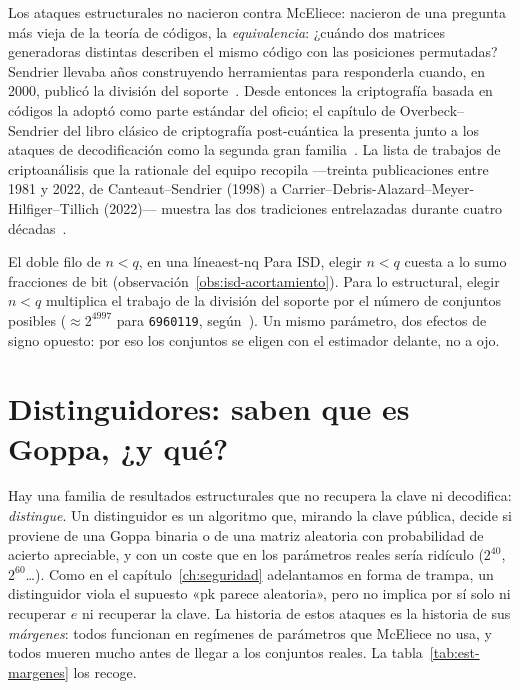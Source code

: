 \begin{historia}
Los ataques estructurales no nacieron contra McEliece: nacieron de
una pregunta más vieja de la teoría de códigos, la
\emph{equivalencia}: ¿cuándo dos matrices generadoras distintas
describen el mismo código con las posiciones permutadas? Sendrier
llevaba años construyendo herramientas para responderla cuando, en
2000, publicó la división del soporte~\cite{sendrier2000}. Desde
entonces la criptografía basada en códigos la adoptó como parte
estándar del oficio; el capítulo de Overbeck--Sendrier del libro
clásico de criptografía post-cuántica la presenta junto a los ataques
de decodificación como la segunda gran familia~\cite{overbeck2009}.
La lista de trabajos de criptoanálisis que la rationale del equipo
recopila ---treinta publicaciones entre 1981 y 2022, de
Canteaut--Sendrier (1998) a Carrier--Debris-Alazard--Meyer-Hilfiger--Tillich
(2022)--- muestra las dos tradiciones entrelazadas durante cuatro
décadas~\cite{cmrationale,canteautsendrier1998,carrier2022}.
\end{historia}

\begin{observacion}{El doble filo de $n<q$, en una línea}{est-nq}
Para ISD, elegir $n<q$ cuesta a lo sumo fracciones de bit
(observación~\ref{obs:isd-acortamiento}). Para lo estructural,
elegir $n<q$ multiplica el trabajo de la división del soporte por el
número de conjuntos posibles ($\approx 2^{4997}$ para
\texttt{6960119}, según~\cite{cmrationale}). Un mismo parámetro,
dos efectos de signo opuesto: por eso los conjuntos se eligen con el
estimador delante, no a ojo.
\end{observacion}

\section{Distinguidores: saben que es Goppa, ¿y qué?}\label{sec:est-distinguidores}

Hay una familia de resultados estructurales que no recupera la
clave ni decodifica: \emph{distingue}. Un distinguidor es un
algoritmo que, mirando la clave pública, decide si proviene de una
Goppa binaria o de una matriz aleatoria con probabilidad de acierto
apreciable, y con un coste que en los parámetros reales sería
ridículo ($2^{40}$, $2^{60}$\dots). Como en el capítulo~\ref{ch:seguridad}
adelantamos en forma de trampa, un distinguidor viola el supuesto
«pk parece aleatoria», pero no implica por sí solo ni recuperar $e$
ni recuperar la clave. La historia de estos ataques es la historia de
sus \emph{márgenes}: todos funcionan en regímenes de parámetros que
McEliece no usa, y todos mueren mucho antes de llegar a los
conjuntos reales. La tabla~\ref{tab:est-margenes} los recoge.

